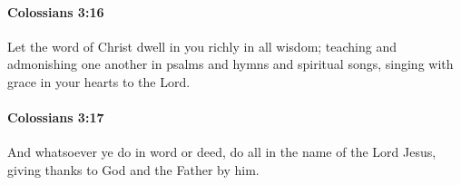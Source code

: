 		\paragraph{Colossians 3:16} %
			\label{COLOSSIANS-3-16}

			Let the word of Christ dwell in you richly in all wisdom; teaching and admonishing one another in psalms and hymns and spiritual songs, singing with grace in your hearts to the Lord.

			\begin{framed}
			\scriptsize
				\begin{compactdesc}
					\item[SBLG] 
				\end{compactdesc}
			\end{framed}

		\paragraph{Colossians 3:17} %
			\label{COLOSSIANS-3-17}

			And whatsoever ye do in word or deed, do all in the name of the Lord Jesus, giving thanks to God and the Father by him.

